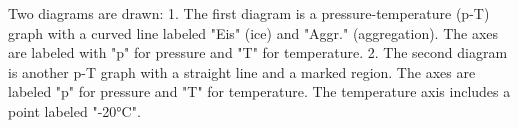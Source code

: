 Two diagrams are drawn:  
1. The first diagram is a pressure-temperature (p-T) graph with a curved line labeled "Eis" (ice) and "Aggr." (aggregation). The axes are labeled with "p" for pressure and "T" for temperature.  
2. The second diagram is another p-T graph with a straight line and a marked region. The axes are labeled "p" for pressure and "T" for temperature. The temperature axis includes a point labeled "-20°C".